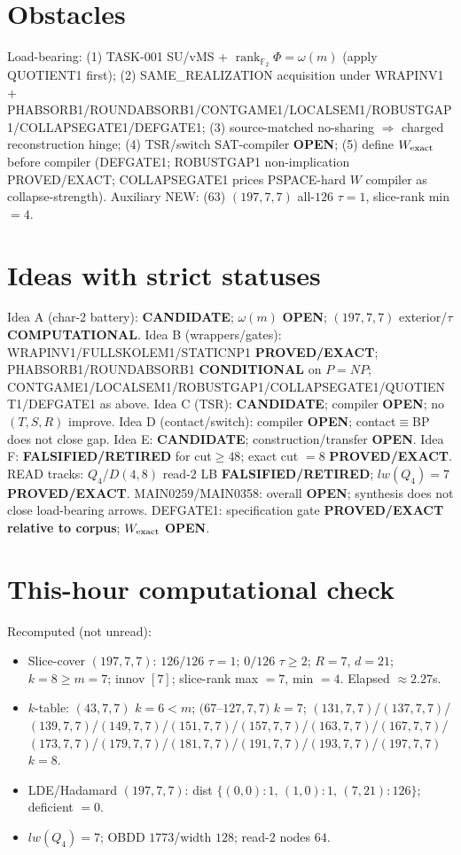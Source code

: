 \documentclass[11pt]{article}
\begin{document}
\section*{Obstacles}
Load-bearing: (1) TASK-001 SU/vMS + $\operatorname{rank}_{\mathbb F_2}\Phi=\omega(m)$ (apply QUOTIENT1 first);
(2) SAME\_REALIZATION acquisition under WRAPINV1 + PHABSORB1/ROUNDABSORB1/CONTGAME1/LOCALSEM1/ROBUSTGAP1/COLLAPSEGATE1/DEFGATE1;
(3) source-matched no-sharing $\Rightarrow$ charged reconstruction hinge;
(4) TSR/switch SAT-compiler \textbf{OPEN};
(5) define $W_{\rm exact}$ before compiler (DEFGATE1; ROBUSTGAP1 non-implication PROVED/EXACT;
COLLAPSEGATE1 prices PSPACE-hard $W$ compiler as collapse-strength).
Auxiliary NEW: (63) $(197,7,7)$ all-$126$ $\tau{=}1$, slice-rank min $=4$.

\section*{Ideas with strict statuses}
Idea A (char-2 battery): \textbf{CANDIDATE}; $\omega(m)$ \textbf{OPEN}; $(197,7,7)$ exterior/$\tau$ \textbf{COMPUTATIONAL}.
Idea B (wrappers/gates): WRAPINV1/FULLSKOLEM1/STATICNP1 \textbf{PROVED/EXACT};
PHABSORB1/ROUNDABSORB1 \textbf{CONDITIONAL} on $P=NP$;
CONTGAME1/LOCALSEM1/ROBUSTGAP1/COLLAPSEGATE1/QUOTIENT1/DEFGATE1 as above.
Idea C (TSR): \textbf{CANDIDATE}; compiler \textbf{OPEN}; no $(T,S,R)$ improve.
Idea D (contact/switch): compiler \textbf{OPEN}; contact$\equiv$BP does not close gap.
Idea E: \textbf{CANDIDATE}; construction/transfer \textbf{OPEN}.
Idea F: \textbf{FALSIFIED/RETIRED} for cut$\ge48$; exact cut $=8$ \textbf{PROVED/EXACT}.
READ tracks: $Q_4$/$D(4,8)$ read-$2$ LB \textbf{FALSIFIED/RETIRED}; $lw(Q_4)=7$ \textbf{PROVED/EXACT}.
MAIN0259/MAIN0358: overall \textbf{OPEN}; synthesis does not close load-bearing arrows.
DEFGATE1: specification gate \textbf{PROVED/EXACT relative to corpus}; $W_{\rm exact}$ \textbf{OPEN}.

\section*{This-hour computational check}
Recomputed (not unread):
\begin{itemize}
\item Slice-cover $(197,7,7)$: $126/126$ $\tau{=}1$; $0/126$ $\tau{\ge}2$; $R{=}7$, $d{=}21$;
  $k{=}8{\ge}m{=}7$; innov $[7]$; slice-rank max $=7$, min $=4$. Elapsed $\approx2.27$s.
\item $k$-table: $(43,7,7)$ $k{=}6{<}m$; $(67$--$127,7,7)$ $k{=}7$;
  $(131,7,7)$/$(137,7,7)$/$(139,7,7)$/$(149,7,7)$/$(151,7,7)$/$(157,7,7)$/$(163,7,7)$/$(167,7,7)$/$(173,7,7)$/$(179,7,7)$/$(181,7,7)$/$(191,7,7)$/$(193,7,7)$/$(197,7,7)$ $k{=}8$.
\item LDE/Hadamard $(197,7,7)$: dist $\{(0,0){:}1,\,(1,0){:}1,\,(7,21){:}126\}$; deficient $=0$.
\item $lw(Q_4)=7$; OBDD $1773$/width $128$; read-$2$ nodes $64$.
\end{itemize}
\end{document}
